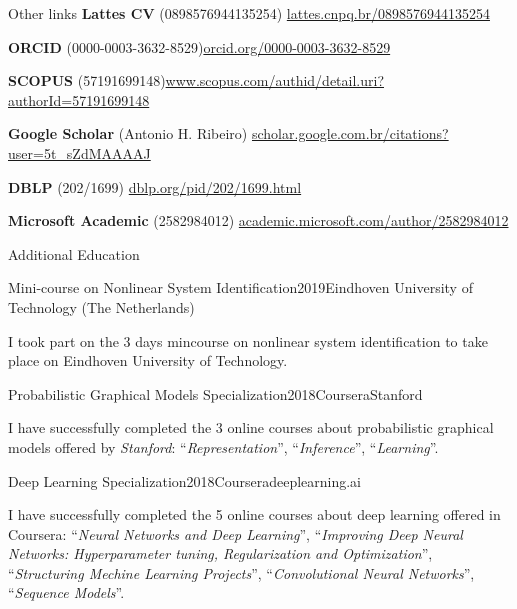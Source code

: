 \documentclass{resume} %
\begin{document}
\begin{rSection}{Other links}
{\bf Lattes CV} {(0898576944135254)} \hfill\href{http://lattes.cnpq.br/0898576944135254}{lattes.cnpq.br/0898576944135254}

{\bf ORCID} {(0000-0003-3632-8529)}\hfill {\href{https://orcid.org/0000-0003-3632-8529}{orcid.org/0000-0003-3632-8529}}

{\bf SCOPUS} {(57191699148)}\hfill{\href{https://www.scopus.com/authid/detail.uri?authorId=57191699148}{www.scopus.com/authid/detail.uri?authorId=57191699148}}

{\bf Google Scholar} {(Antonio H. Ribeiro)}\hfill
{\href{https://scholar.google.com.br/citations?user=5t_sZdMAAAAJ}{scholar.google.com.br/citations?user=5t\_sZdMAAAAJ}}

{\bf DBLP} {(202/1699)}\hfill{
\href{https://dblp.org/pid/202/1699.html}{dblp.org/pid/202/1699.html}}

{\bf Microsoft Academic} {(2582984012)}\hfill{
\href{https://academic.microsoft.com/author/2582984012}{academic.microsoft.com/author/2582984012}}


\end{rSection}

\begin{rSection}{Additional Education}

\begin{rSubsection}{Mini-course on Nonlinear System Identification}{2019}{}{Eindhoven University of Technology (The Netherlands)}

  \item I took part on the 3 days mincourse on nonlinear system identification to take place on Eindhoven University of Technology.
\end{rSubsection}

\begin{rSubsection}{Probabilistic Graphical Models Specialization}{2018}{Coursera}{Stanford}

  \item I have successfully completed the 3 online courses about probabilistic graphical models offered by \textit{Stanford}: ``\textit{Representation}'', ``\textit{Inference}'', ``\textit{Learning}''.
\end{rSubsection}

\begin{rSubsection}{Deep Learning Specialization}{2018}{Coursera}{deeplearning.ai}

  \item I have successfully completed the 5 online courses about deep learning offered in Coursera: ``\textit{Neural Networks and Deep Learning}'', ``\textit{Improving Deep Neural Networks: Hyperparameter tuning, Regularization and Optimization}'', ``\textit{Structuring Mechine Learning Projects}'', ``\textit{Convolutional Neural Networks}'', ``\textit{Sequence Models}''.
\end{rSubsection}


\end{rSection}
\end{document}
